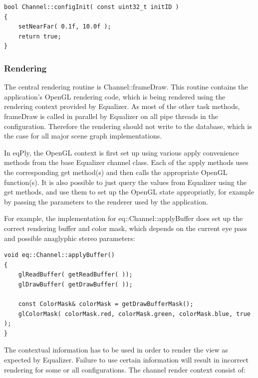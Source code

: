 \documentclass[10pt,a4]{scrartcl}
\begin{document}
{\footnotesize\begin{lstlisting}
bool Channel::configInit( const uint32_t initID )
{
    setNearFar( 0.1f, 10.0f );
    return true;
}
\end{lstlisting}}

\subsubsection{Rendering}

The central rendering routine is \textsf{Channel::frameDraw}. This
routine contains the application's OpenGL rendering code, which is being
rendered using the rendering context provided by Equalizer. As most of
the other task methods, \textsf{frameDraw} is called in parallel by
Equalizer on all pipe threads in the configuration. Therefore the
rendering should not write to the database, which is the case for all
major scene graph implementations.

In \textsf{eqPly}, the OpenGL context is first set up using various
\textsf{apply} convenience methods from the base Equalizer channel
class. Each of the \textsf{apply} methods uses the corresponding
\textsf{get} method(s) and then calls the appropriate OpenGL
function(s). It is also possible to just query the values from Equalizer
using the \textsf{get} methods, and use them to set up the OpenGL state
appropriatly, for example by passing the parameters to the renderer used
by the application.

For example, the implementation for \textsf{eq::Channel::applyBuffer}
does set up the correct rendering buffer and color mask, which depends
on the current eye pass and possible anaglyphic stereo parameters:

{\footnotesize\begin{lstlisting}
void eq::Channel::applyBuffer()
{
    glReadBuffer( getReadBuffer( ));
    glDrawBuffer( getDrawBuffer( ));
    
    const ColorMask& colorMask = getDrawBufferMask();
    glColorMask( colorMask.red, colorMask.green, colorMask.blue, true );
}
\end{lstlisting}}

The contextual information has to be used in order to render the view as
expected by Equalizer. Failure to use certain information will result in
incorrect rendering for some or all configurations. The channel render
context consist of:
\end{document}

